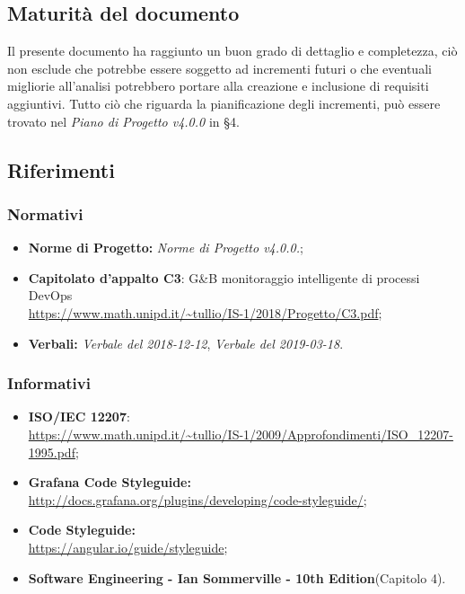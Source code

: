 \subsection{Maturità del documento}
Il presente documento ha raggiunto un buon grado di dettaglio e completezza, ciò non esclude che potrebbe essere soggetto ad incrementi futuri o che eventuali migliorie all'analisi potrebbero portare alla creazione e inclusione di requisiti aggiuntivi.
Tutto ciò che riguarda la pianificazione degli incrementi, può essere trovato nel \emph{Piano di Progetto v4.0.0} in §4.
\subsection{Riferimenti}
\subsubsection{Normativi}
\begin{itemize}
	\item \textbf{Norme di Progetto:} \emph{Norme di Progetto v4.0.0.};
	\item \textbf{Capitolato d'appalto C3}: G\&B monitoraggio intelligente di processi DevOps \\
	\url{https://www.math.unipd.it/~tullio/IS-1/2018/Progetto/C3.pdf};
	\item \textbf{Verbali:} \emph{Verbale del 2018-12-12}, \emph{Verbale del 2019-03-18}.
\end{itemize}
\subsubsection{Informativi}
\begin{itemize}
	\item \textbf{ISO/IEC 12207}:\\ \url{https://www.math.unipd.it/~tullio/IS-1/2009/Approfondimenti/ISO_12207-1995.pdf};
	\item \textbf{Grafana Code Styleguide:} \\
	\url{http://docs.grafana.org/plugins/developing/code-styleguide/};
	\item \textbf{ Code Styleguide:} \\
	\url{https://angular.io/guide/styleguide};
	\item \textbf{Software Engineering - Ian Sommerville - 10th Edition}(Capitolo 4).
\end{itemize}
\pagebreak
